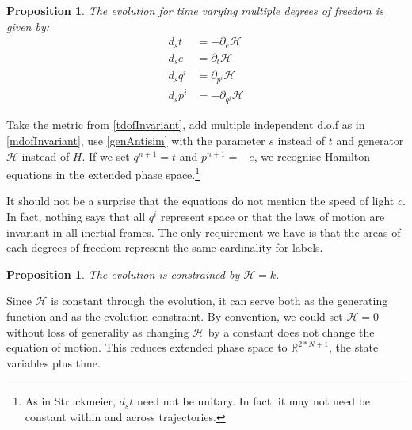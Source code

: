 \documentclass[twocolumn,floatfix,nofootinbib]{revtex4}   %
\theoremstyle{theorem}
\newtheorem{prop}[thm]{Proposition}
\theoremstyle{definition}
\begin{document}
\begin{prop}\label{tdofHam}
The evolution for time varying multiple degrees of freedom is given by:
\begin{align*}
d_{s}t &= - \partial_{e} \mathcal{H} \\
d_{s}e &= \partial_{t} \mathcal{H} \\
d_{s}q^i &= \partial_{p^i} \mathcal{H} \\
d_{s}p^i &= - \partial_{q^i} \mathcal{H}
\end{align*}
\end{prop}

Take the metric from \ref{tdofInvariant}, add multiple independent d.o.f as in \ref{mdofInvariant}, use \ref{genAntisim} with the parameter $s$ instead of $t$ and generator $\mathcal{H}$ instead of $H$. If we set $q^{n+1}=t$ and $p^{n+1}=-e$, we recognise Hamilton equations in the extended phase space.\cite{Synge}\cite{Lanczos}\footnote{As in Struckmeier\cite{Struckmeier}, $d_{s}t$ need not be unitary. In fact, it may not need be constant within and across trajectories.}

It should not be a surprise that the equations do not mention the speed of light $c$. In fact, nothing says that all $q^i$ represent space or that the laws of motion are invariant in all inertial frames. The only requirement we have is that the areas of each degrees of freedom represent the same cardinality for labels.

\begin{prop}\label{tdofConstrain}
The evolution is constrained by $\mathcal{H}=k$.
\end{prop}

Since $\mathcal{H}$ is constant through the evolution, it can serve both as the generating function and as the evolution constraint. By convention, we could set $\mathcal{H}=0$ without loss of generality as changing $\mathcal{H}$ by a constant does not change the equation of motion. This reduces extended phase space to $\mathbb{R}^{2*N + 1}$, the state variables plus time.
\end{document}
